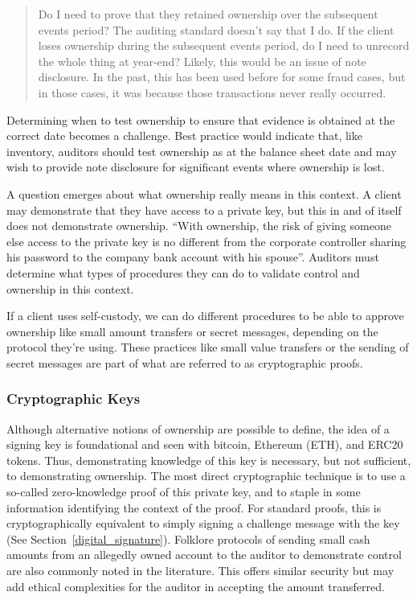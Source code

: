 \begin{quote}
Do I need to prove that they retained ownership over the subsequent events period? The auditing standard doesn't say that I do. If the client loses ownership during the subsequent events period, do I need to unrecord the whole thing at year-end? Likely, this would be an issue of note disclosure. In the past, this has been used before for some fraud cases, but in those cases, it was because those transactions never really occurred.
\end{quote}

Determining when to test ownership to ensure that evidence is obtained at the correct date becomes a challenge. Best practice would indicate that, like inventory, auditors should test ownership as at the balance sheet date and may wish to provide note disclosure for significant events where ownership is lost. 

A question emerges about what ownership really means in this context. A client may demonstrate that they have access to a private key, but this in and of itself does not demonstrate ownership. ``With ownership, the risk of giving someone else access to the private key is no different from the corporate controller sharing his password to the company bank account with his spouse''. Auditors must determine what types of procedures they can do to validate control and ownership in this context.

If a client uses self-custody, we can do different procedures to be able to approve ownership like small amount transfers or secret messages, depending on the protocol they're using. These practices like small value transfers or the sending of secret messages are part of what are referred to as cryptographic proofs. 

\subsubsection{Cryptographic Keys} 

Although alternative notions of ownership are possible to define, the idea of a signing key is foundational and seen with bitcoin, Ethereum (ETH), and ERC20 tokens. Thus, demonstrating knowledge of this key is necessary, but not sufficient, to demonstrating ownership. The most direct cryptographic technique is to use a so-called zero-knowledge proof of this private key, and to staple in some information identifying the context of the proof. For standard proofs, this is cryptographically equivalent to simply signing a challenge message with the key (See Section~\ref{digital_signature}). Folklore protocols of sending small cash amounts from an allegedly owned account to the auditor to demonstrate control are also commonly noted in the literature. This offers similar security but may add ethical complexities for the auditor in accepting the amount transferred. 

